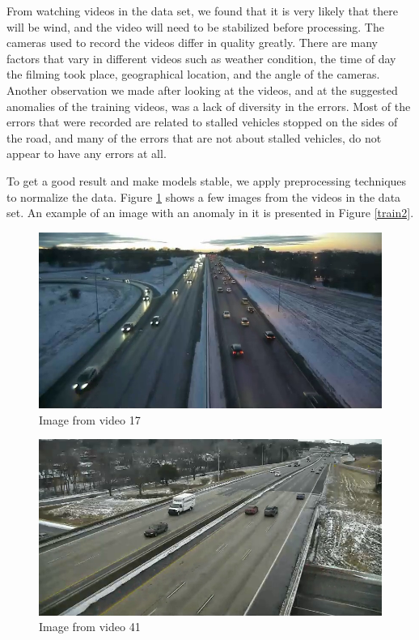 \documentclass[10pt,twocolumn,letterpaper]{article}
\begin{document}
From watching videos in the data set, we found that it is very likely that there will be wind, and the video will need to be stabilized before processing. The cameras used to record the videos differ in quality greatly. There are many factors that vary in different videos such as weather condition, the time of day the filming took place, geographical location, and the angle of the cameras. Another observation we made after looking at the videos, and at the suggested anomalies of the training videos, was a lack of diversity in the errors. Most of the errors that were recorded are related to stalled vehicles stopped on the sides of the road, and many of the errors that are not about stalled vehicles, do not appear to have any errors at all.

To get a good result and make models stable, we apply preprocessing techniques to normalize the data. Figure \ref{train17} shows a few images from the videos in the data set. An example of an image with an anomaly in it is presented in Figure \ref{train2}.

\begin{figure}  
    \includegraphics[scale=.29]{images/anomalyTrain17.png}
    \caption{Image from video 17}
    \label{train17}
\end{figure}

\begin{figure}  
    \includegraphics[scale=.29]{images/anomalyTrain41.png}
    \caption{Image from video 41}
    \label{train41}
\end{figure}
\end{document}

